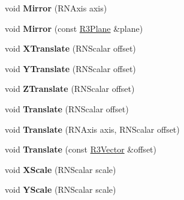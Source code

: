 \begin{DoxyCompactItemize}
\item 
void {\bfseries Mirror} (R\+N\+Axis axis)\hypertarget{class_r3_affine_a74245bd59ed5de0a11c78ded8b548299}{}\label{class_r3_affine_a74245bd59ed5de0a11c78ded8b548299}

\item 
void {\bfseries Mirror} (const \hyperlink{class_r3_plane}{R3\+Plane} \&plane)\hypertarget{class_r3_affine_a3206a6e8079e9f66193017627c2c9041}{}\label{class_r3_affine_a3206a6e8079e9f66193017627c2c9041}

\item 
void {\bfseries X\+Translate} (R\+N\+Scalar offset)\hypertarget{class_r3_affine_a61562d891e42536575d9cec92c6e7845}{}\label{class_r3_affine_a61562d891e42536575d9cec92c6e7845}

\item 
void {\bfseries Y\+Translate} (R\+N\+Scalar offset)\hypertarget{class_r3_affine_ae6fa0231cc4bface61148a2bcd7fecd7}{}\label{class_r3_affine_ae6fa0231cc4bface61148a2bcd7fecd7}

\item 
void {\bfseries Z\+Translate} (R\+N\+Scalar offset)\hypertarget{class_r3_affine_af90791329ecd24378304e13d8f50b0ac}{}\label{class_r3_affine_af90791329ecd24378304e13d8f50b0ac}

\item 
void {\bfseries Translate} (R\+N\+Scalar offset)\hypertarget{class_r3_affine_a6278a5d31a94ba06974e577605e8aafa}{}\label{class_r3_affine_a6278a5d31a94ba06974e577605e8aafa}

\item 
void {\bfseries Translate} (R\+N\+Axis axis, R\+N\+Scalar offset)\hypertarget{class_r3_affine_a2541ce2c6211ae9d138042ce1f6ff0af}{}\label{class_r3_affine_a2541ce2c6211ae9d138042ce1f6ff0af}

\item 
void {\bfseries Translate} (const \hyperlink{class_r3_vector}{R3\+Vector} \&offset)\hypertarget{class_r3_affine_ad7e08915c335d218bbfedaf6bf51c482}{}\label{class_r3_affine_ad7e08915c335d218bbfedaf6bf51c482}

\item 
void {\bfseries X\+Scale} (R\+N\+Scalar scale)\hypertarget{class_r3_affine_ac3bfeaabf58c646f3f31fdc6549b995c}{}\label{class_r3_affine_ac3bfeaabf58c646f3f31fdc6549b995c}

\item 
void {\bfseries Y\+Scale} (R\+N\+Scalar scale)\hypertarget{class_r3_affine_a4b9ac77969baedbae2678df5a953c01b}{}\label{class_r3_affine_a4b9ac77969baedbae2678df5a953c01b}


\end{DoxyCompactItemize}
